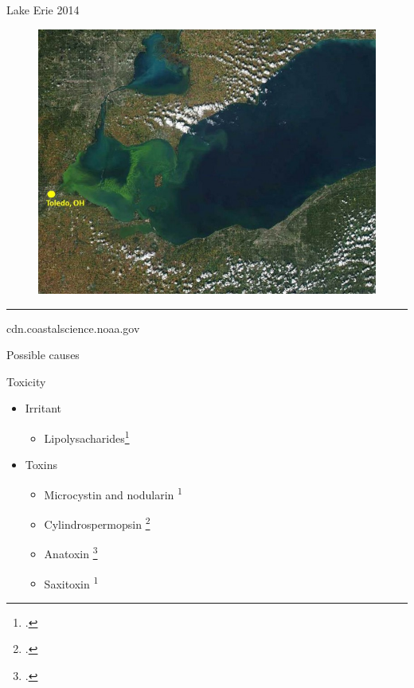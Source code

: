 \begin{frame}{Lake Erie 2014}
	\begin{figure}
		\centering
		\includegraphics[scale=0.35]{erie.jpg}
	\end{figure}
\hrule
{\tiny cdn.coastalscience.noaa.gov}
\end{frame}
\begin{frame}{Possible causes}

\end{frame}
\begin{frame}{Toxicity}

	\begin{itemize}
		\item Irritant
			\begin{itemize}
				\item Lipolysacharides\footcite{moore_richard_cyanobacterial_1993}
			\end{itemize}
		\item Toxins
			\begin{itemize} 
				\item Microcystin and nodularin \textsuperscript{1}
  				\item Cylindrospermopsin \footcite{dittmann_cyanobacterial_2012}
				\item Anatoxin \footcite{codd_cyanobacterial_1999}
				\item Saxitoxin \textsuperscript{1}
			\end{itemize}
	\end{itemize}

\end{frame}
